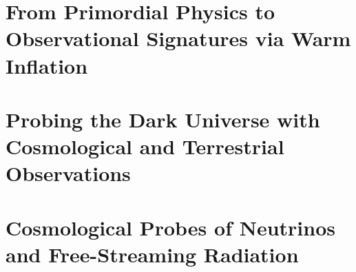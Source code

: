 \part{From Primordial Physics to Observational Signatures via Warm Inflation}
\label{part:warm-inflation}


















\part{Probing the Dark Universe with Cosmological and Terrestrial Observations}
\label{part:dark-Universe}














\part{Cosmological Probes of Neutrinos and Free-Streaming Radiation}
\label{part:neutrinos}

